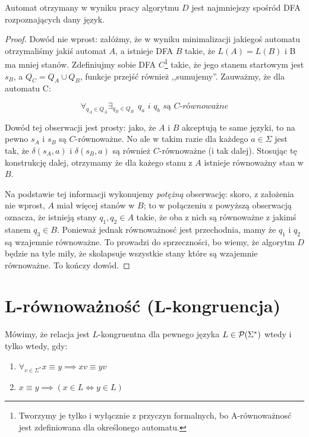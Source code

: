 \begin{theorem}
	Automat otrzymany w wyniku pracy algorytmu \(D\) jest najmniejszy spośród DFA rozpoznających dany język.
\end{theorem}
\begin{proof}
	Dowód nie wprost: załóżmy, że w wyniku minimalizacji jakiegoś automatu otrzymaliśmy jakiś automat \(A\), a istnieje DFA \(B\) takie, że \( L(A) = L(B) \) i B ma mniej stanów. Zdefiniujmy sobie DFA \(C\)\footnote{Tworzymy je tylko i wyłącznie z przyczyn formalnych, bo A-równoważnosć jest zdefiniowana dla określonego automatu.} takie, że jego stanem startowym jest \(s_B\), a \(Q_C = Q_A \cup Q_B\), funkcje przejść również ,,sumujemy''. Zauważmy, że dla automatu C:

	\[
		\forall_{q_A \in Q_A} \exists_{q_B \in Q_B}  \hspace{5pt} \textit{\(q_a\) i \(q_b\) są \(C\)-równoważne}
	\]

	Dowód tej obserwacji jest prosty: jako, że \(A\) i \(B\) akceptują te same języki, to na pewno \(s_A\) i \(s_B\) są \(C\)-równoważne. No ale w takim razie dla każdego \(a \in \Sigma\) jest tak, że \(\delta(s_A, a)\) i \(\delta(s_B, a)\) są również \(C\)-równoważne (i tak dalej). Stosując tę konstrukcję dalej, otrzymamy że dla każego stanu z \(A\) istnieje równoważny stan w \(B\).

	Na podstawie tej informacji wykonujemy \textit{potężną} obserwację: skoro, z założenia nie wprost, \(A\) miał więcej stanów w \(B\); to w połączeniu z powyższą obserwacją oznacza, że istnieją stany \(q_1, q_2 \in A\) takie, że oba z nich są równoważne z jakimś stanem \(q_3 \in B\). Ponieważ jednak równoważnosć jest przechodnia, mamy że \(q_1\) i \(q_2\) są wzajemnie równoważne. To prowadzi do sprzeczności, bo wiemy, że algorytm \(D\) będzie na tyle miły, że skolapsuje wszystkie stany które są wzajemnie równoważne. To kończy dowód.

\end{proof}

\section{L-równoważność (L-kongruencja)}

\begin{definition}
	Mówimy, że relacja jest \(L\)-kongruentna dla pewnego języka \(L \in \operatorname{\mathcal{P}}(\Sigma^*)\) wtedy i tylko wtedy, gdy:
	\begin{enumerate}
		\item \(\forall_{v \in \Sigma^*} x \equiv y \implies xv \equiv yv \)
		\item \( x \equiv y \implies (x \in L \iff y \in L)\)
	\end{enumerate}
\end{definition}

